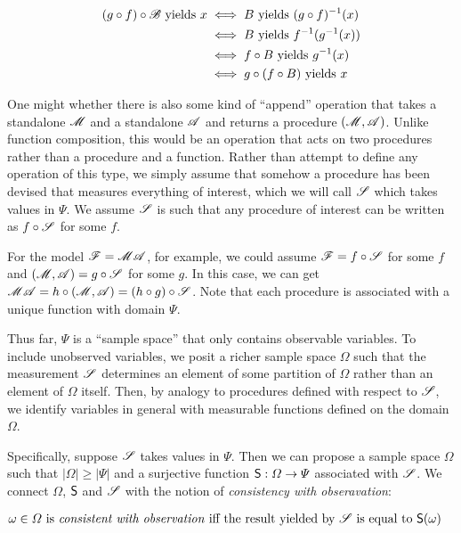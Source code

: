\begin{align}
	(g\circ f)\circ\mathscr{B}\text{ yields } x &\iff B\text{ yields } (g\circ f)^{-1}(x) \\
	&\iff B\text{ yields } f^{-1}(g^{-1}(x))\\
	&\iff f\circ B \text{ yields } g^{-1}(x)\\
	&\iff g\circ(f\circ B)\text{ yields } x
\end{align}


One might whether there is also some kind of ``append'' operation that takes a standalone $\mathscr{M}$ and a standalone $\mathscr{A}$ and returns a procedure $(\mathscr{M},\mathscr{A})$. Unlike function composition, this would be an operation that acts on two procedures rather than a procedure and a function. Rather than attempt to define any operation of this type, we simply assume that somehow a procedure has been devised that measures everything of interest, which we will call $\mathscr{S}$ which takes values in $\Psi$. We assume $\mathscr{S}$ is such that any procedure of interest can be written as $f\circ \mathscr{S}$ for some $f$.

For the model $\mathscr{F}=\mathscr{MA}$, for example, we could assume $\mathscr{F}=f\circ \mathscr{S}$ for some $f$ and $(\mathscr{M},\mathscr{A})=g\circ \mathscr{S}$ for some $g$. In this case, we can get $\mathscr{MA}=h\circ(\mathscr{M},\mathscr{A})=(h\circ g)\circ\mathscr{S}$. Note that each procedure is associated with a unique function with domain $\Psi$.

Thus far, $\Psi$ is a ``sample space'' that only contains observable variables. To include unobserved variables, we posit a richer sample space $\Omega$ such that the measurement $\mathscr{S}$ determines an element of some partition of $\Omega$ rather than an element of $\Omega$ itself. Then, by analogy to procedures defined with respect to $\mathscr{S}$, we identify variables in general with measurable functions defined on the domain $\Omega$. 

Specifically, suppose $\mathscr{S}$ takes values in $\Psi$. Then we can propose a sample space $\Omega$ such that $|\Omega|\geq |\Psi|$ and a surjective function $\mathsf{S}:\Omega\to \Psi$ associated with $\mathscr{S}$. We connect $\Omega$, $\mathsf{S}$ and $\mathscr{S}$ with the notion of \emph{consistency with obseravation}:

\begin{align}
 &\omega\in \Omega\text{ is \emph{consistent with observation} iff the result yielded by }\mathscr{S}\text{ is equal to }\mathsf{S}(\omega)\label{def:observable}
\end{align}

